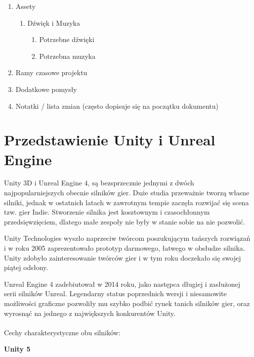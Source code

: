 \documentclass[openright]{xmgr}
\begin{document}
\begin{enumerate}
\begin{enumerate}
  \end{enumerate}
  \item Assety
  \begin{enumerate}
    \item Dźwięk i Muzyka
    \begin{enumerate}
      \item Potrzebne dźwięki
      \item Potrzebna muzyka
    \end{enumerate}
  \end{enumerate}
  \item Ramy czasowe projektu
  \item Dodatkowe pomysły
  \item Notatki / lista zmian (często dopisuje się na początku dokumentu)	
\end{enumerate}

\chapter{Przedstawienie Unity i Unreal Engine}

Unity 3D i Unreal Engine 4, są bezsprzecznie jednymi z dwóch najpopularniejszych obecnie silników gier. Duże studia przeważnie tworzą własne silniki, jednak  w ostatnich latach w zawrotnym tempie zaczęła rozwijać się scena tzw. gier Indie. Stworzenie silnika jest kosztownym i czasochłonnym przedsięwzięciem, dlatego małe zespoły nie były w stanie sobie na nie pozwolić.

Unity Technologies wyszło naprzeciw twórcom poszukującym tańszych rozwiązań i w roku 2005 zaprezentowało prototyp darmowego, łatwego w obsłudze silnika. Unity zdobyło zainteresowanie twórców gier i w tym roku doczekało się swojej piątej odsłony.

Unreal Engine 4 zadebiutował w 2014 roku, jako następca długiej i zasłużonej serii silników Unreal. Legendarny status poprzednich wersji i niesamowite możliwości graficzne pozwoliły mu szybko podbić rynek tanich silników gier, oraz wyrosnąć na jednego z największych konkurentów Unity.
\\
\\
Cechy charakterystyczne obu silników:

\textbf{Unity 5}
\end{document}
